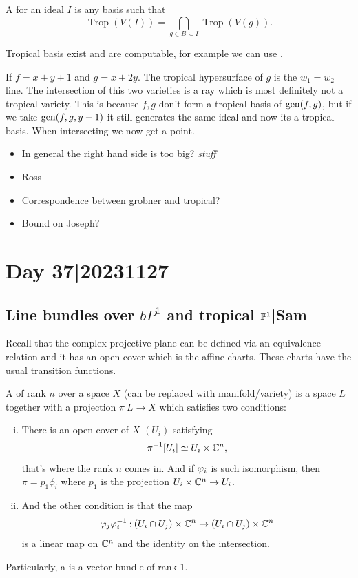 \documentclass[12pt]{memoir}
\DeclareMathOperator{\Trop}{Trop}
\begin{document}
\begin{Def}
    A  for an ideal $I$ is any basis such that 
    $$\Trop(V(I))=\bigcap_{g\in B\subseteq I}\Trop(V(g)).$$
\end{Def}

Tropical basis exist and are computable, for example we can use .
\begin{Ex}
    If $f=x+y+1$ and $g=x+2y$. The tropical hypersurface of $g$ is the $w_1=w_2$ line. The intersection of this two varieties is a ray which is most definitely not a tropical variety. This is because $f,g$ don't form a tropical basis of $\operatorname{gen}(f,g)$, but if we take $\operatorname{gen}(f,g,y-1)$ it still generates the same ideal and now its a tropical basis. When intersecting we now get a point.
\end{Ex}

\begin{itemize}
    \item In general the right hand side is too big? \emph{stuff}
    \item Ross 
    \item Correspondence between grobner and tropical? 
    \item Bound on Joseph?
\end{itemize}

\section{Day 37|20231127}

\subsection{Line bundles over $bP^1$ and tropical $\mathbb{P}^1$|Sam}

Recall that the complex projective plane can be defined via an equivalence relation and it has an open cover which is the affine charts. These charts have the usual transition functions. 

\begin{Def}
    A  of rank $n$ over a space $X$ (can be replaced with manifold/variety) is a space $L$ together with a projection $\pi\: L\to X$ which satisfies two conditions:
    \begin{enumerate}[i)]
        \item There is an open cover of $X$ $(U_i)$ satisfying 
        $$\pi^{-1}[U_i]\simeq U_i\times\mathbb{C}^n,$$
        that's where the rank $n$ comes in. And if $\varphi_i$ is such isomorphism, then $\pi=p_1\phi_i$ where $p_1$ is the projection $U_i\times\mathbb{C}^n\to U_i$.
        \item And the other condition is that the map 
        $$\varphi_j\varphi_i^{-1}\mathbin{:} (U_i\cap U_j)\times\mathbb{C}^n\to(U_i\cap U_j)\times\mathbb{C}^n$$
        is a linear map on $\mathbb{C}^n$ and the identity on the intersection.
    \end{enumerate}
    Particularly, a  is a vector bundle of rank 1.
\end{Def}
\end{document}
